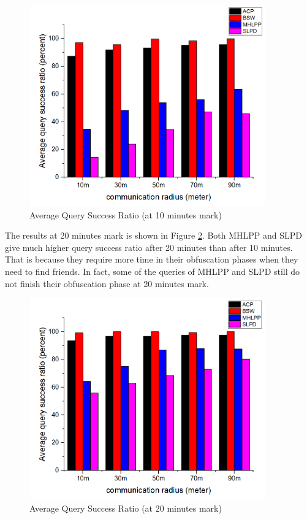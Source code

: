 \begin{figure} [H]
  \centering 
  \includegraphics[width=4.0in]{figures/F414AverageQuerySuccessRatio10minutes.png}
  \caption{Average Query Success Ratio (at 10 minutes mark)} 
  \label{fig:AverageQuerySuccessRatio10} %
\end{figure}

The results at 20 minutes mark is shown in Figure \ref{fig:AverageQuerySuccessRatio20}. Both MHLPP and SLPD give much higher query success ratio after 20 minutes than after 10 minutes. That is because they require more time in their obfuscation phases when they need to find friends. In fact, some of the queries of MHLPP and SLPD still do not finish their obfuscation phase at 20 minutes mark.

\begin{figure} [H]
  \centering 
  \includegraphics[width=4.0in]{figures/F415AverageQuerySuccessRatio20minutes.png}
  \caption{Average Query Success Ratio (at 20 minutes mark)} 
  \label{fig:AverageQuerySuccessRatio20} %
\end{figure}

